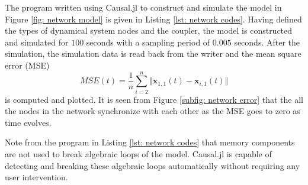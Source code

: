 The program written using Causal.jl to construct and simulate the model in Figure \ref{fig: network model} is given in Listing \ref{lst: network codes}. Having defined the types of dynamical system nodes and the coupler, the model is constructed and simulated for $100$ seconds with a sampling period of $0.005$ seconds. After the simulation, the simulation data is read back from the writer and the mean square error (MSE) 
\begin{equation}
    MSE(t) = \dfrac{1}{n} \sum_{i = 2}^n \Vert \bm{x}_{1,1}(t) - \bm{x}_{i,1}(t) \Vert
\end{equation}
is computed and plotted. It is seen from Figure \ref{subfig: network error} that the all the nodes in the network synchronize with each other as the MSE goes to zero as time evolves. 

Note from the program in Listing \ref{lst: network codes} that memory components are not used to break algebraic loops of the model. Causal.jl is capable of detecting and breaking these algebraic loops automatically without requiring any user intervention. 


